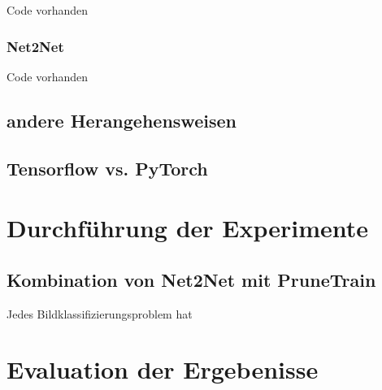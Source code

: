 Code vorhanden


\subsubsection{Net2Net}

Code vorhanden

\subsection{andere Herangehensweisen}




\subsection{Tensorflow vs. PyTorch}


\section{Durchführung der Experimente}


\subsection{Kombination von Net2Net mit PruneTrain}
Jedes Bildklassifizierungsproblem hat 


\section{Evaluation der Ergebenisse}
